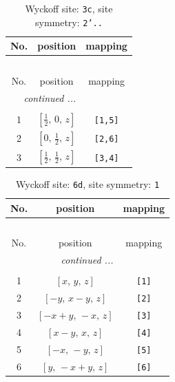 \documentclass[fleqn,8pt]{jsarticle}
\begin{document}
\begin{longtable}{ccc}
\caption{Wyckoff site: {\tt 3c}, site symmetry: {\tt 2'..}}
 \\
 \hline \hline
No. & position & mapping \\ \hline \endfirsthead

\multicolumn{2}{l}{\tablename\ \thetable{}} \\
 \hline \hline
No. & position & mapping \\ \hline \endhead

 \hline \hline
\multicolumn{2}{r}{\footnotesize\it continued ...} \\ \endfoot

 \hline \hline
\multicolumn{2}{r}{} \\ \endlastfoot

1 & $\left[ \frac{1}{2},\, 0,\, z \right]$ & {\tt [1,5]} \\ \hline
2 & $\left[ 0,\, \frac{1}{2},\, z \right]$ & {\tt [2,6]} \\ \hline
3 & $\left[ \frac{1}{2},\, \frac{1}{2},\, z \right]$ & {\tt [3,4]} \\
\end{longtable}
\renewcommand{\arraystretch}{1.2}
\begin{longtable}{ccc}
\caption{Wyckoff site: {\tt 6d}, site symmetry: {\tt 1}}
 \\
 \hline \hline
No. & position & mapping \\ \hline \endfirsthead

\multicolumn{2}{l}{\tablename\ \thetable{}} \\
 \hline \hline
No. & position & mapping \\ \hline \endhead

 \hline \hline
\multicolumn{2}{r}{\footnotesize\it continued ...} \\ \endfoot

 \hline \hline
\multicolumn{2}{r}{} \\ \endlastfoot

1 & $\left[ x,\, y,\, z \right]$ & {\tt [1]} \\ \hline
2 & $\left[ - y,\, x - y,\, z \right]$ & {\tt [2]} \\ \hline
3 & $\left[ - x + y,\, - x,\, z \right]$ & {\tt [3]} \\ \hline
4 & $\left[ x - y,\, x,\, z \right]$ & {\tt [4]} \\ \hline
5 & $\left[ - x,\, - y,\, z \right]$ & {\tt [5]} \\ \hline
6 & $\left[ y,\, - x + y,\, z \right]$ & {\tt [6]} \\
\end{longtable}
\end{document}
